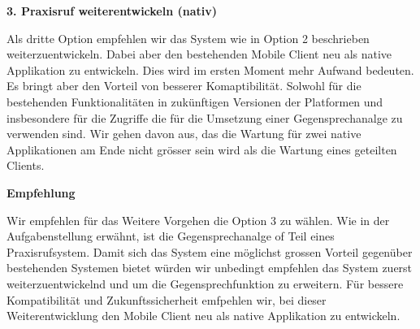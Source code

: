 \clearpage
\textbf{3. Praxisruf weiterentwickeln (nativ) }

Als dritte Option empfehlen wir das System wie in Option 2 beschrieben weiterzuentwickeln.
Dabei aber den bestehenden Mobile Client neu als native Applikation zu entwickeln.
Dies wird im ersten Moment mehr Aufwand bedeuten.
Es bringt aber den Vorteil von besserer Komaptibilität.
Solwohl für die bestehenden Funktionalitäten in zukünftigen Versionen der Platformen und insbesondere für die Zugriffe die für die Umsetzung einer Gegensprechanalge zu verwenden sind.
Wir gehen davon aus, das die Wartung für zwei native Applikationen am Ende nicht grösser sein wird als die Wartung eines geteilten Clients.

\textbf{Empfehlung}

Wir empfehlen für das Weitere Vorgehen die Option 3 zu wählen.
Wie in der Aufgabenstellung erwähnt, ist die Gegensprechanalge of Teil eines Praxisrufsystem.
Damit sich das System eine möglichst grossen Vorteil gegenüber bestehenden Systemen bietet würden wir unbedingt empfehlen das System zuerst weiterzuentwickelnd und um die Gegensprechfunktion zu erweitern.
Für bessere Kompatibilität und Zukunftssicherheit emfpehlen wir, bei dieser Weiterentwicklung den Mobile Client neu als native Applikation zu entwickeln.


\clearpage


\clearpage
